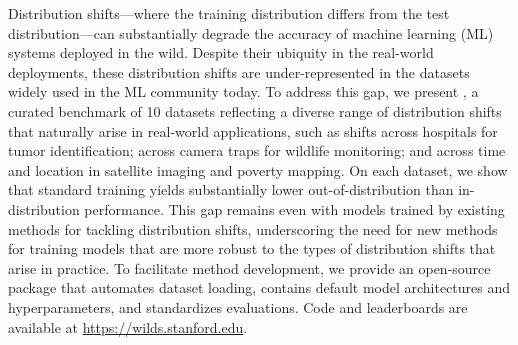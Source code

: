 Distribution shifts---where the training distribution differs from the test distribution---can substantially degrade the accuracy of machine learning (ML) systems deployed in the wild.
Despite their ubiquity in the real-world deployments, these distribution shifts are under-represented in the datasets widely used in the ML community today.
To address this gap, we present \Wilds, a curated benchmark of 10 datasets reflecting a diverse range of distribution shifts that naturally arise in real-world applications, such as shifts across hospitals for tumor identification; across camera traps for wildlife monitoring; and across time and location in satellite imaging and poverty mapping.
On each dataset, we show that standard training yields substantially lower out-of-distribution than in-distribution performance.
This gap remains even with models trained by existing methods for tackling distribution shifts,
underscoring the need for new methods for training models that are more robust to the types of distribution shifts that arise in practice.
To facilitate method development, we provide an open-source package that automates dataset loading, contains default model architectures and hyperparameters, and standardizes evaluations.
Code and leaderboards are available at \url{https://wilds.stanford.edu}.
